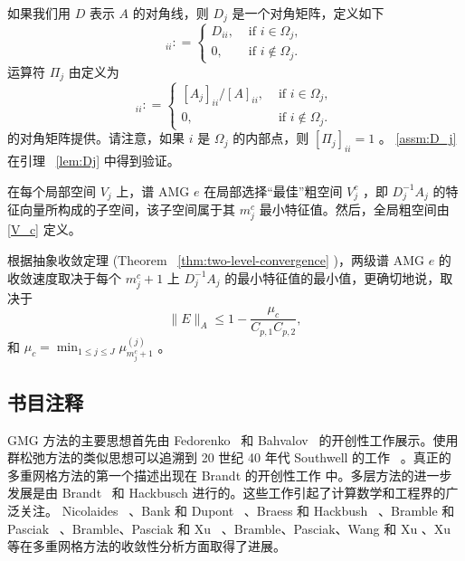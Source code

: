 \documentclass[12pt]{acta_2011xz}
\begin{document}
如果我们用    $D$    表示    $A$    的对角线，则    $D_j$    是一个对角矩阵，定义如下
   \begin{equation}
    [D_j]_{ii}: = \begin{cases}
        D_{ii}, & \text{ if } i\in \Omega_j, \\ 
        0, & \text{ if } i\notin \Omega_j.
    \end{cases}
\end{equation}    运算符    $\Pi_j$    由定义为
   \begin{equation}
    [\Pi_j]_{ii}: = \begin{cases}
        [A_j]_{ii}/[A]_{ii}, & \text{ if } i\in \Omega_j, \\ 
        0, & \text{ if } i\notin \Omega_j.
    \end{cases}
\end{equation}    的对角矩阵提供。请注意，如果    $i$    是    $\Omega_j$    的内部点，则    $[\Pi_j]_{ii}=1$    。   \eqref{assm:D_j}    在引理~    \ref{lem:Dj}    中得到验证。  

在每个局部空间    $V_j$    上，谱 AMG    $e$    在局部选择“最佳”粗空间    $V_j^c$   ，即    $D_j^{-1}A_j$    的特征向量所构成的子空间，该子空间属于其    $m_j^c$    最小特征值。然后，全局粗空间由    \eqref{V_c}    定义。  

根据抽象收敛定理 (Theorem~    \ref{thm:two-level-convergence}    )，两级谱 AMG    $e$    的收敛速度取决于每个    $m_j^c+1$    上    $D_j^{-1}A_j$    的最小特征值的最小值，更确切地说，取决于    \begin{equation*}
    \|E\|_A\le 1-\frac{\mu_c}{C_{p,1}C_{p,2}},
\end{equation*}    和    $\mu_c=\min_{1\le j\le J} \mu_{m_j^c+1}^{(j)}$    。  

   \subsection{书目注释  }    
GMG 方法的主要思想首先由 Fedorenko~    \cite{1961FedorenkoR-aa,1964FedorenkoR-aa}    和 Bahvalov~    \cite{1966BahvalovN-aa}    的开创性工作展示。使用群松弛方法的类似思想可以追溯到 20 世纪 40 年代 Southwell 的工作~    \cite{1940SouthwellR-aa,1946SouthwellR-aa}    。真正的多重网格方法的第一个描述出现在 Brandt 的开创性工作    \cite{1973BrandtA-aa}    中。多层方法的进一步发展是由 Brandt~    \cite{1977BrandtA-aa}    和 Hackbusch
   \cite{1977HackbuschW-aa,1978HackbuschW-aa}    进行的。这些工作引起了计算数学和工程界的广泛关注。 Nicolaides~    \cite{1975NicolaidesR-aa,1977NicolaidesR-aa}    、Bank 和 Dupont~    \cite{1980BankR_DupontT-aa}    、Braess 和 Hackbush~    \cite{1983BraessD_HackbuschW-aa}    、Bramble 和 Pasciak~    \cite{bramble1987new}    、Bramble、Pasciak 和 Xu~    \cite{bramble1990parallel,1991BrambleJ_PasciakJ_XuJ-aa}    、Bramble、Pasciak、Wang 和 Xu    \cite{1991BrambleJ_PasciakJ_WangJ_XuJ-ac}    、Xu    \cite{1992XuJ-aa}    等在多重网格方法的收敛性分析方面取得了进展。  
\end{document}
